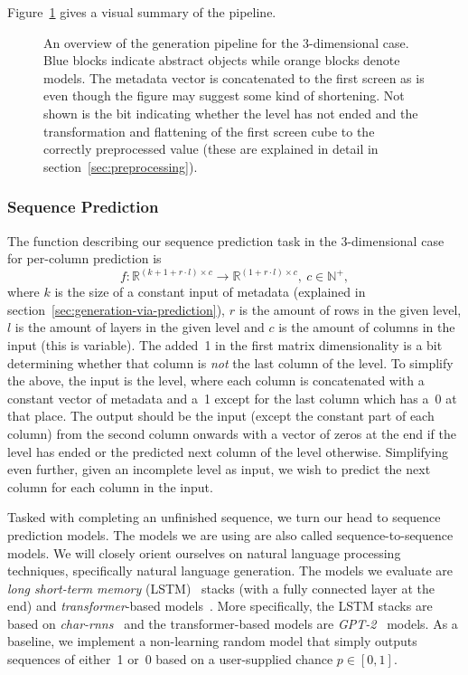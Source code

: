 Figure~\ref{fig:pipeline} gives a visual summary of the pipeline.

\begin{figure}[t]
  \centering
  
  \caption{An overview of the generation pipeline for the
    3-dimensional case. Blue blocks indicate abstract objects while
    orange blocks denote models. The metadata vector is concatenated to
    the first screen as is even though the figure may suggest some
    kind of shortening. Not shown is the bit indicating whether the
    level has not ended and the transformation and flattening of the
    first screen cube to the correctly preprocessed value (these are
    explained in detail in section~\ref{sec:preprocessing}).}
  \label{fig:pipeline}
\end{figure}

\subsubsection{Sequence Prediction}
\label{sec:sequence-prediction}

The function describing our sequence prediction task in the
3-dimensional case for per-column prediction is
\begin{equation*}
  f: \mathbb{R}^{(k + 1 + r \cdot l) \times c} \to \mathbb{R}^{(1 + r \cdot l) \times c},\ c \in \mathbb{N}^{+},
\end{equation*}
where $k$ is the size of a constant input of metadata (explained in
section~\ref{sec:generation-via-prediction}), $r$ is the amount of
rows in the given level, $l$ is the amount of layers in the given
level and $c$ is the amount of columns in the input (this is
variable). The added~1 in the first matrix dimensionality is a bit
determining whether that column is \emph{not} the last column of the
level. To simplify the above, the input is the level, where each
column is concatenated with a constant vector of metadata and a~1
except for the last column which has a~0 at that place. The output
should be the input (except the constant part of each column) from the
second column onwards with a vector of zeros at the end if the level
has ended or the predicted next column of the level otherwise.
Simplifying even further, given an incomplete level as input, we wish
to predict the next column for each column in the input.

Tasked with completing an unfinished sequence, we turn our head to
sequence prediction models. The models we are using are also called
sequence-to-sequence models. We will closely orient ourselves on
natural language processing techniques, specifically natural language
generation. The models we evaluate are \emph{long short-term memory}
(LSTM)~\cite{hochreiterLongShorttermMemory1997} stacks (with a fully
connected layer at the end) and \emph{transformer}-based
models~\cite{vaswaniAttentionAllYou2017}. More specifically, the LSTM
stacks are based on \emph{char-rnns}~\cite{andrejKarpathyCharrnn2019}
and the transformer-based models are
\mbox{\emph{GPT-2}}~\cite{radfordLanguageModelsAre,OpenaiGpt22019}
models. As a baseline, we implement a non-learning random model that
simply outputs sequences of either~1 or~0 based on a user-supplied
chance $p \in [0, 1]$.

